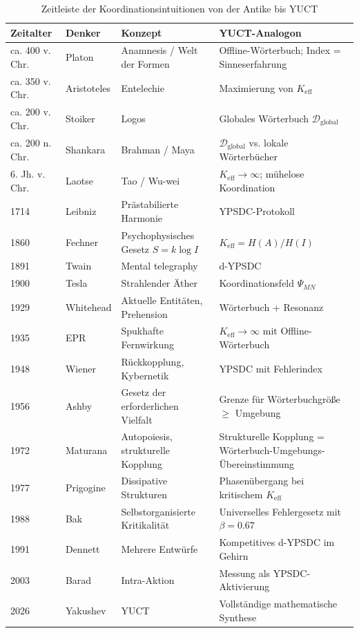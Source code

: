 \documentclass[12pt,a4paper]{article}
\begin{document}
	\begin{table}[htbp]
		\centering
		\caption{Zeitleiste der Koordinationsintuitionen von der Antike bis YUCT}
		\label{tab:timeline}
		\small
		\begin{tabular}{p{1.2cm}p{3cm}p{4.5cm}p{4cm}}
			\toprule
			\textbf{Zeitalter} & \textbf{Denker} & \textbf{Konzept} & \textbf{YUCT-Analogon} \\
			\midrule
			ca. 400 v. Chr. & Platon & Anamnesis / Welt der Formen & Offline-Wörterbuch; Index = Sinneserfahrung \\
			ca. 350 v. Chr. & Aristoteles & Entelechie & Maximierung von \(K_{\mathrm{eff}}\) \\
			ca. 200 v. Chr. & Stoiker & Logos & Globales Wörterbuch \(\mathcal{D}_{\text{global}}\) \\
			ca. 200 n. Chr. & Shankara & Brahman / Maya & \(\mathcal{D}_{\text{global}}\) vs. lokale Wörterbücher \\
			6. Jh. v. Chr. & Laotse & Tao / Wu-wei & \(K_{\mathrm{eff}} \to \infty\); mühelose Koordination \\
			1714 & Leibniz & Prästabilierte Harmonie & YPSDC-Protokoll \\
			1860 & Fechner & Psychophysisches Gesetz \(S = k \log I\) & \(K_{\mathrm{eff}} = H(A)/H(I)\) \\
			1891 & Twain & Mental telegraphy & d-YPSDC \\
			1900 & Tesla & Strahlender Äther & Koordinationsfeld \(\Psi_{MN}\) \\
			1929 & Whitehead & Aktuelle Entitäten, Prehension & Wörterbuch + Resonanz \\
			1935 & EPR & Spukhafte Fernwirkung & \(K_{\mathrm{eff}} \to \infty\) mit Offline-Wörterbuch \\
			1948 & Wiener & Rückkopplung, Kybernetik & YPSDC mit Fehlerindex \\
			1956 & Ashby & Gesetz der erforderlichen Vielfalt & Grenze für Wörterbuchgröße \(\ge\) Umgebung \\
			1972 & Maturana & Autopoiesis, strukturelle Kopplung & Strukturelle Kopplung = Wörterbuch-Umgebungs-Übereinstimmung \\
			1977 & Prigogine & Dissipative Strukturen & Phasenübergang bei kritischem \(K_{\mathrm{eff}}\) \\
			1988 & Bak & Selbstorganisierte Kritikalität & Universelles Fehlergesetz mit \(\beta = 0.67\) \\
			1991 & Dennett & Mehrere Entwürfe & Kompetitives d-YPSDC im Gehirn \\
			2003 & Barad & Intra-Aktion & Messung als YPSDC-Aktivierung \\
			2026 & Yakushev & YUCT & Vollständige mathematische Synthese \\
			\bottomrule
		\end{tabular}
	\end{table}
	
\end{document}
